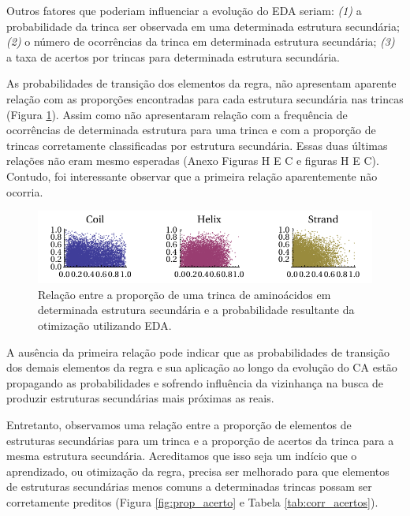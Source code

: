 Outros fatores que poderiam influenciar a evolução do EDA seriam: \textit{(1)} a probabilidade da trinca ser observada em uma determinada estrutura secundária; \textit{(2)} o número de ocorrências da trinca em determinada estrutura secundária; \textit{(3)} a taxa de acertos por trincas para determinada estrutura secundária. 


As probabilidades de transição dos elementos da regra, não apresentam aparente relação com as proporções encontradas para cada estrutura secundária nas trincas (Figura \ref{fig:relacao_prob_propss}). Assim como não apresentaram relação com a frequência de ocorrências de determinada estrutura para uma trinca e com a proporção de trincas corretamente classificadas por estrutura secundária. Essas duas últimas relações não eram mesmo esperadas (Anexo Figuras H E C e figuras H E C). Contudo, foi interessante observar que a primeira relação aparentemente não ocorria.


\begin{figure}
  \centering
  \includegraphics[width=1\textwidth]{figures/relacao_prob_propss.pdf}
  \caption{Relação entre a proporção de uma trinca de aminoácidos em determinada estrutura secundária e a probabilidade resultante da otimização utilizando EDA.}
        \label{fig:relacao_prob_propss}
\end{figure}

A ausência da primeira relação pode indicar que as probabilidades de transição dos demais elementos da regra e sua aplicação ao longo da evolução do CA estão propagando as probabilidades e sofrendo influência da vizinhança na busca de produzir estruturas secundárias mais próximas as reais. 

Entretanto, observamos uma relação entre a proporção de elementos de estruturas secundárias para um trinca e a proporção de acertos da trinca para a mesma estrutura secundária. Acreditamos que isso seja um indício que o aprendizado, ou otimização da regra, precisa ser melhorado para que elementos de estruturas secundárias menos comuns a determinadas trincas possam ser corretamente preditos (Figura \ref{fig:prop_acerto} e Tabela \ref{tab:corr_acertos}).  

